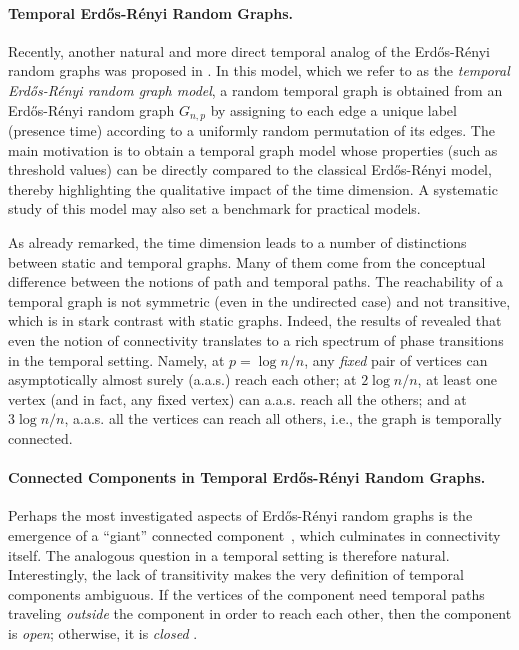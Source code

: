 \documentclass[a4paper,11pt]{article}
\makeatletter
\theoremstyle{definition}
\theoremstyle{plain}
\newcommand{\ie}{i.e.,\xspace}
\newcommand{\aas}{a.a.s.\@\xspace}
\newcommand{\Erdos}{Erd\H{o}s}
\newcommand{\Renyi}{R\'enyi}
\newcommand{\ER}{\Erdos-\Renyi}
\makeatother
\begin{document}
\paragraph*{Temporal \ER{} Random Graphs.}
Recently, another natural and more direct temporal analog of the \ER{} random graphs was proposed in \cite{CasteigtsRRZ21}. 
In this model, which we refer to as the \emph{temporal \ER{} random graph model}, a random temporal graph is obtained from an \ER{} random graph $G_{n,p}$ by assigning to each edge a unique label (presence time) according to a uniformly random permutation of its edges.
The main motivation is to obtain a temporal graph model whose properties (such as threshold values) can be directly compared to the classical \ER{} model, thereby highlighting the qualitative impact of the time dimension.
A systematic study of this model may also set a benchmark for practical models.


As already remarked, the time dimension leads to a number of distinctions between static and temporal graphs. Many of them come from the conceptual difference between the notions of path and temporal paths.
The reachability of a temporal graph is not symmetric (even in the undirected case) and not transitive, which is in stark contrast with static graphs.
Indeed, the results of \cite{CasteigtsRRZ21} revealed that even the notion of connectivity translates to a rich spectrum of phase transitions in the temporal setting.
Namely, at $p=\log n/n$, any \emph{fixed} pair of
vertices can asymptotically almost surely (\aas) reach each other; at $2\log n/n$, at least one
vertex (and in fact, any fixed vertex) can \aas reach all the others;
and at $3\log n/n$, \aas all the vertices can reach all others, \ie
the graph is temporally connected.

\paragraph*{Connected Components in Temporal \ER{} Random Graphs.}
Perhaps the most investigated aspects of \ER{} random graphs is the emergence of a ``giant'' connected component~\cite{Bollobas2001,frieze_karonski_2015}, which culminates in connectivity itself. The analogous question in a temporal setting is therefore natural.
Interestingly, the lack of transitivity makes the very definition of temporal components ambiguous. If the vertices of the component need temporal paths traveling \emph{outside} the component in order to reach each other, then the component is \emph{open}; otherwise, it is \emph{closed} \cite{BF03}.
\end{document}
